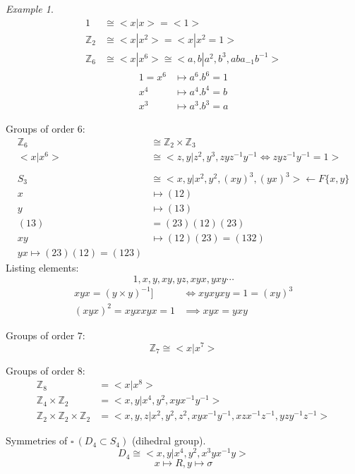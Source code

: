 \documentclass{article}
\let\ddd\cdots
\newcommand{\Z}{\mathbb{Z}}
\theoremstyle{definition}
\theoremstyle{remark}
\theoremstyle{example}
\newtheorem*{example}{Example}
\begin{document}
		\begin{example}
			\begin{align*}
				1 & \cong <x|x>=<1>\\
				\Z_2 & \cong <x|x^2> = <x|x^2=1>\\
				\Z_6 & \cong <x|x^6> \cong <a,b|a^2,b^3,aba_{-1}b^{-1}>
			\end{align*}
			\begin{align*}
				1=x^6 & \mapsto a^6 . b^6 = 1\\
				x^4 & \mapsto a^4.b^4 = b\\
				x^3 & \mapsto a^3.b^3 = a
			\end{align*}
		\end{example}
	
		Groups of order $6$:\\
		\begin{align*}
			\Z_6 & \cong \Z_2 \times \Z_3\\
			<x|x^6> & \cong <z,y|z^2,y^3,zyz^{-1}y^{-1} \iff zyz^{-1}y^{-1}=1>\\
			\\
			S_3 & \cong <x,y | x^2,y^2,(xy)^3 ,(yx)^3> \leftarrow F\{x,y\}\\
			x & \mapsto (12)\\
			y  & \mapsto (13)\\
			(13) & = (23)(12)(23)\\
			xy & \mapsto (12)(23) = (132)\\
			yx \mapsto (23)(12) = (123)
		\end{align*}
		Listing elements: \[1,x,y,xy,yz,xyx,yxy \ddd \]
		\begin{align*}
			xyx=(y \times y)^{-1}] & \iff xyxyxy=1=(xy)^3\\
			(xyx)^2=xyxxyx=1 & \implies xyx=yxy
		\end{align*}
		
		Groups of order $7$:\\
		\[
			\Z_7 \cong <x|x^7>
		\]
		
		Groups of order $8$:\\
		\begin{align*}
			\Z_8 & = <x|x^8>\\
			\Z_4 \times \Z_2 & = <x,y| x^4,y^2,xyx^{-1}y^{-1}>\\
			\Z_2 \times \Z_2 \times \Z_2 & = <x,y,z|x^2,y^2,z^2,xyx^{-1}y^{-1},xzx^{-1}z^{-1},yzy^{-1}z^{-1}>
		\end{align*}
		
		Symmetries of $\square\ (D_4 \subset S_4)$ (dihedral group).
		\[D_4 \cong <x,y| x^4,y^2,x^3yx^{-1}y>\] 
		\[ x \mapsto R, y \mapsto \sigma \]
		
\end{document}
